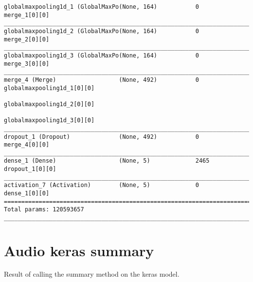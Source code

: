 \begin{lstlisting}[basicstyle=\tiny,frame=single]
globalmaxpooling1d_1 (GlobalMaxPo(None, 164)           0           merge_1[0][0]
____________________________________________________________________________________________________
globalmaxpooling1d_2 (GlobalMaxPo(None, 164)           0           merge_2[0][0]
____________________________________________________________________________________________________
globalmaxpooling1d_3 (GlobalMaxPo(None, 164)           0           merge_3[0][0]
____________________________________________________________________________________________________
merge_4 (Merge)                  (None, 492)           0           globalmaxpooling1d_1[0][0]
                                                                   globalmaxpooling1d_2[0][0]
                                                                   globalmaxpooling1d_3[0][0]
____________________________________________________________________________________________________
dropout_1 (Dropout)              (None, 492)           0           merge_4[0][0]                      
____________________________________________________________________________________________________  
dense_1 (Dense)                  (None, 5)             2465        dropout_1[0][0]                    
____________________________________________________________________________________________________  
activation_7 (Activation)        (None, 5)             0           dense_1[0][0]                      
====================================================================================================  
Total params: 120593657                            
____________________________________________________________________________________________________  
\end{lstlisting}

\section{Audio keras summary}

Result of calling the summary method on the keras model.

